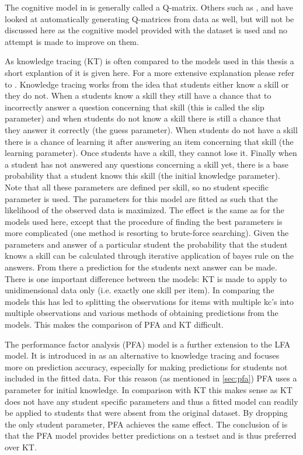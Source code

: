 \documentclass{scrartcl}
\begin{document}
The cognitive model in \cite{lfa} is generally called a Q-matrix. Others such as \cite{matrixfact}, \cite{qm1} and \cite{qm2} have looked at automatically generating Q-matrices from data as well, but will not be discussed here as the cognitive model provided with the dataset is used and no attempt is made to improve on them.

As knowledge tracing (KT) is often compared to the models used in this thesis a short explantion of it is given here. For a more extensive explanation please refer to \cite{kt}. Knowledge tracing works from the idea that students either know a skill or they do not. When a students know a skill they still have a chance that to incorrectly answer a question concerning that skill (this is called the slip parameter) and when students do not know a skill there is still a chance that they answer it correctly (the guess parameter). When students do not have a skill there is a chance of learning it after answering an item concerning that skill (the learning parameter). Once students have a skill, they cannot lose it. Finally when a student has not answered any questions concerning a skill yet, there is a base probability that a student knows this skill (the initial knowledge parameter). Note that all these parameters are defined per skill, so no student specific parameter is used. The parameters for this model are fitted as such that the likelihood of the observed data is maximized. The effect is the same as for the models used here, except that the procedure of finding the best parameters is more complicated (one method is resorting to brute-force searching). Given the parameters and answer of a particular student the probability that the student knows a skill can be calculated through iterative application of bayes rule on the answers. From there a prediction for the students next answer can be made. There is one important difference between the models: KT is made to apply to unidimensional data only (i.e. exactly one skill per item). In comparing the models this has led to splitting the observations for items with multiple kc's into multiple observations and various methods of obtaining predictions from the models. This makes the comparison of PFA and KT difficult.

The performance factor analysis (PFA) model is a further extension to the LFA model. It is introduced in \cite{pfa} as an alternative to knowledge tracing and focuses more on prediction accuracy, especially for making predictions for students not included in the fitted data. For this reason (as mentioned in \ref{sec:pfa}) PFA uses a parameter for initial knowledge. In comparison with KT this makes sense as KT does not have any student specific parameters and thus a fitted model can readily be applied to students that were absent from the original dataset. By dropping the only student parameter, PFA achieves the same effect. The conclusion of \cite{pfa} is that the PFA model provides better predictions on a testset and is thus preferred over KT.
\end{document}
